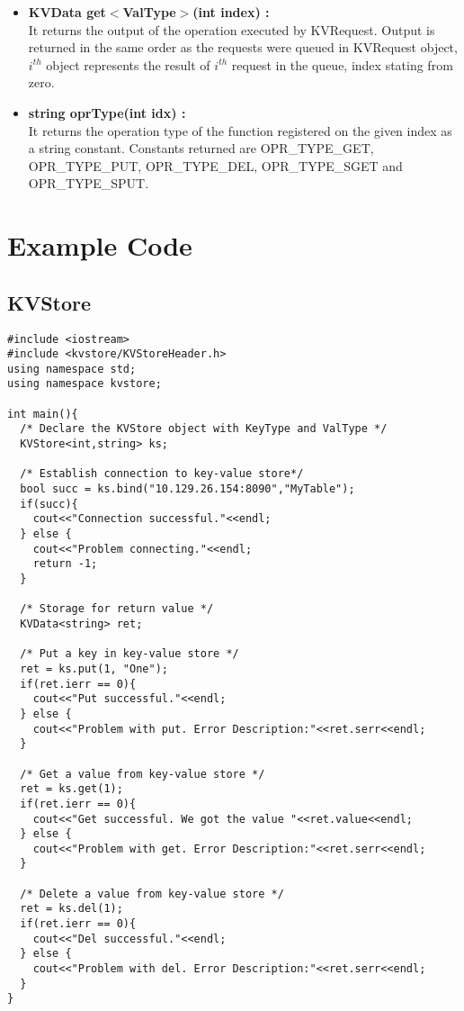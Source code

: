 \documentclass[11pt]{article}
\begin{document}
\begin{itemize}
\begin{itemize}
\item \textbf{KVData get$<$ValType$>$(int index) :}\\
It returns the output of the operation executed by KVRequest. Output is returned in the same order as the requests were queued in KVRequest object, $i^{th}$ object represents the result of $i^{th}$ request in the queue, index stating from zero.\\

\item \textbf{string oprType(int idx) :}\\
It returns the operation type of the function registered on the given index as a string constant. Constants returned are OPR\_TYPE\_GET, OPR\_TYPE\_PUT, OPR\_TYPE\_DEL, OPR\_TYPE\_SGET and OPR\_TYPE\_SPUT.
\end{itemize}
\end{itemize}

\section{Example Code}
\subsection{KVStore}
\begin{lstlisting}
#include <iostream>
#include <kvstore/KVStoreHeader.h>
using namespace std;
using namespace kvstore;

int main(){
  /* Declare the KVStore object with KeyType and ValType */
  KVStore<int,string> ks;
  
  /* Establish connection to key-value store*/
  bool succ = ks.bind("10.129.26.154:8090","MyTable");
  if(succ){
    cout<<"Connection successful."<<endl;
  } else {
    cout<<"Problem connecting."<<endl;
    return -1;
  }
  
  /* Storage for return value */
  KVData<string> ret;
  
  /* Put a key in key-value store */
  ret = ks.put(1, "One");
  if(ret.ierr == 0){
    cout<<"Put successful."<<endl;
  } else {
    cout<<"Problem with put. Error Description:"<<ret.serr<<endl;
  }
  
  /* Get a value from key-value store */
  ret = ks.get(1);
  if(ret.ierr == 0){
    cout<<"Get successful. We got the value "<<ret.value<<endl;
  } else {
    cout<<"Problem with get. Error Description:"<<ret.serr<<endl;
  }
  
  /* Delete a value from key-value store */
  ret = ks.del(1);
  if(ret.ierr == 0){
    cout<<"Del successful."<<endl;
  } else {
    cout<<"Problem with del. Error Description:"<<ret.serr<<endl;
  }
}
\end{lstlisting}
\end{document}
